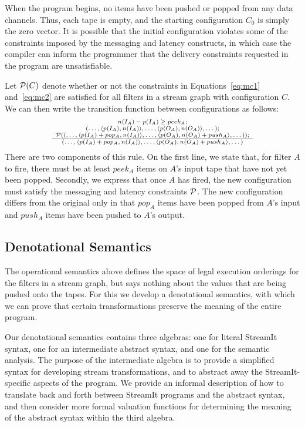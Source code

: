 When the program begins, no items have been pushed or popped from any
data channels.  Thus, each tape is empty, and the starting
configuration $C_0$ is simply the zero vector.  It is possible that
the initial configuration violates some of the constraints imposed by
the messaging and latency constructs, in which case the compiler can
inform the programmer that the delivery constraints requested in the
program are unsatisfiable.

Let ${\cal P}(C)$ denote whether or not the constraints in
Equations~\ref{eq:mc1} and~\ref{eq:mc2} are satisfied for all filters
in a stream graph with configuration $C$.  We can then write the
transition function between configurations as follows:
\[
\begin{scriptsize}
\begin{array}{c}
n(I_A) - p(I_A) \ge peek_A; \\ (\dots , \langle p(I_A), n(I_A) \rangle, \dots,
\langle p(O_A), n(O_A) \rangle, \dots); \\ {\cal P}((\dots , \langle p(I_A)+pop_A, n(I_A) \rangle, \dots,
\langle p(O_A), n(O_A)+push_A \rangle, \dots)); \\ \hline (\dots , \langle p(I_A)+pop_A,
n(I_A) \rangle, \dots, \langle p(O_A), n(O_A)+push_A \rangle, \dots)
\end{array}
\end{scriptsize}
\]
There are two components of this rule.  On the first line, we state
that, for filter $A$ to fire, there must be at least $peek_A$ items on
$A$'s input tape that have not yet been popped.  Secondly, we express
that once $A$ has fired, the new configuration must satisfy the
messaging and latency constraints ${\cal P}$.  The new configuration differs
from the original only in that $pop_A$ items have been popped from
$A$'s input and $push_A$ items have been pushed to $A$'s output.

\subsection{Denotational Semantics}

The operational semantics above defines the space of legal execution
orderings for the filters in a stream graph, but says nothing about
the values that are being pushed onto the tapes.  For this we develop
a denotational semantics, with which we can prove that certain
transformations preserve the meaning of the entire program.

Our denotational semantics contains three algebras: one for literal
StreamIt syntax, one for an intermediate abstract syntax, and one for
the semantic analysis.  The purpose of the intermediate algebra is to
provide a simplified syntax for developing stream transformations, and
to abstract away the StreamIt-specific aspects of the program.  We
provide an informal description of how to translate back and forth
between StreamIt programs and the abstract syntax, and then consider
more formal valuation functions for determining the meaning of the
abstract syntax within the third algebra.

